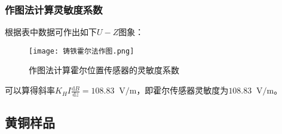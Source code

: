 \documentclass[11pt]{article}
\newcommand*{\unit}[1]{\mathop{}\!\mathrm{#1}}
\newcommand*{\deriv}[2]{\frac{\mathrm{d} #1}{\mathrm{d} {#2}}}
\begin{document}
\subsubsection{作图法计算灵敏度系数}

根据表中数据可作出如下$ U-Z $图象：

\begin{figure}[H]
    \centering
    \caption{作图法计算霍尔位置传感器的灵敏度系数}
    \texttt{[image: 铸铁霍尔法作图.png]}
\end{figure}

可以算得斜率$\displaystyle K_H I \deriv{B}{z}  = 108.83 \unit{V/m}$，即霍尔传感器灵敏度为$108.83\unit{V/m}$。

\subsection{黄铜样品}
\end{document}
